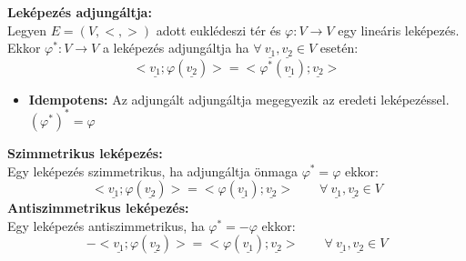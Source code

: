 \documentclass[11pt,a4paper]{article}
\begin{document}
    \begin{tcolorbox}[colback=red!5!white,colframe=red!60!black,title= 2. Leképezés adjungáltja{,} szimmetrikus és antiszimmetrikus leképezés]
    \textbf{Leképezés adjungáltja:} \\
        Legyen $E = (V, <,>)$ adott euklédeszi tér és $\varphi:V \rightarrow V$ egy lineáris leképezés. \\
        Ekkor $\varphi^*:V \rightarrow V$ a leképezés adjungáltja ha $\forall \ \underline{v_1}, \underline{v_2} \in V$ esetén: \\
        $$<\underline{v_1}; \varphi(\underline{v_2})> = <\varphi^*(\underline{v_1}); \underline{v_2}>$$
        \begin{itemize}
            \item \textbf{Idempotens:} Az adjungált adjungáltja megegyezik az eredeti leképezéssel. $(\varphi^*)^* = \varphi$
        \end{itemize}
    \textbf{Szimmetrikus leképezés:} \\
        Egy leképezés szimmetrikus, ha adjungáltja önmaga $\varphi^* = \varphi$ ekkor:
        $$<\underline{v_1}; \varphi(\underline{v_2})> = <\varphi(\underline{v_1}); \underline{v_2}> \quad\quad \forall \ \underline{v_1}, \underline{v_2} \in V$$
    \textbf{Antiszimmetrikus leképezés:} \\
        Egy leképezés antiszimmetrikus, ha $\varphi^* = -\varphi$ ekkor:
        $$-<\underline{v_1}; \varphi(\underline{v_2})> = <\varphi(\underline{v_1}); \underline{v_2}> \quad\quad \forall \ \underline{v_1}, \underline{v_2} \in V$$ 
    \end{tcolorbox}
\end{document}

